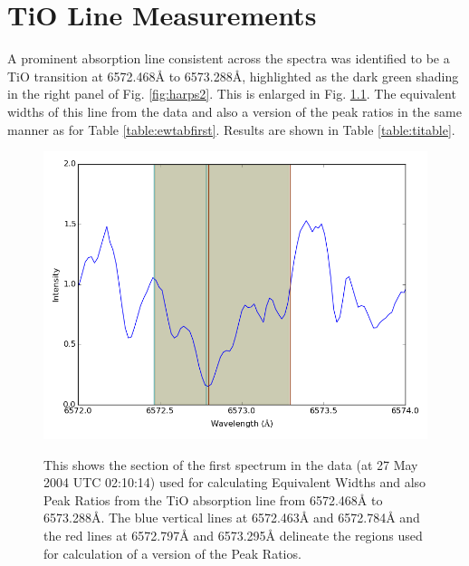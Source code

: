 \chapter{TiO Line Measurements} %
\protect\label{chapter:tioline}

A prominent absorption line consistent across the spectra was identified to be a TiO transition at 6572.468{\AA} to
6573.288{\AA}, highlighted as the dark green shading in the right panel of Fig. \ref{fig:harps2}. This is enlarged
in Fig. \ref{fig:tispec}. The equivalent widths of this line from the {\harps} data and also a version of the peak
ratios in the same manner as for Table \ref{table:ewtabfirst}. Results are shown in Table \ref{table:titable}.

\begin{figure}[!htbp]
\begin{center}
\includegraphics[scale=0.25]{Figures/tispec.png} \\
\end{center}   
\caption{This shows the section of the first spectrum in the {\harps} data (at 27 May 2004 UTC 02:10:14) used for
  calculating Equivalent Widths and also Peak Ratios from the TiO absorption line from 6572.468{\AA} to
  6573.288{\AA}. The blue vertical lines at 6572.463{\AA} and 6572.784{\AA} and the red lines at 6572.797{\AA} and
  6573.295{\AA} delineate the regions used for calculation of a version of the Peak Ratios.}
\protect\label{fig:tispec}
\end{figure}

